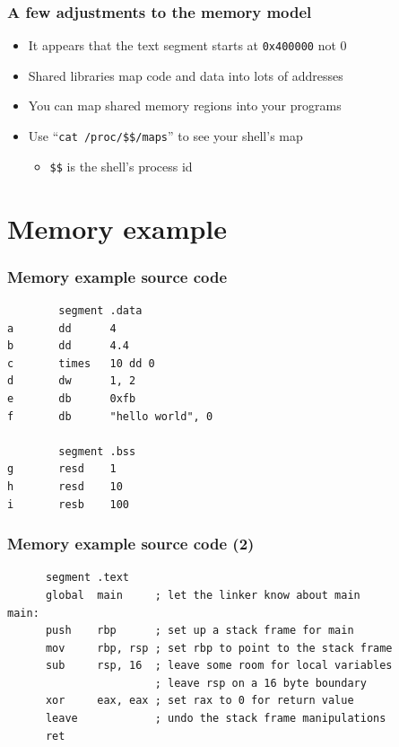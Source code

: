 \documentclass{beamer}
\begin{document}
\begin{frame}
    \frametitle{A few adjustments to the memory model}
    \begin{itemize}
        \item It appears that the text segment starts at {\tt 0x400000} not 0
        \item Shared libraries map code and data into lots of addresses
        \item You can map shared memory regions into your programs
        \item Use ``{\tt cat /proc/\$\$/maps}'' to see your shell's map
        \begin{itemize}
            \item {\tt \$\$} is the shell's process id
        \end{itemize}
    \end{itemize}
\end{frame}

\section{Memory example}

\begin{frame}[fragile]
    \frametitle{Memory example source code}
\begin{verbatim}
        segment .data
a       dd      4
b       dd      4.4
c       times   10 dd 0
d       dw      1, 2
e       db      0xfb
f       db      "hello world", 0

        segment .bss
g       resd    1
h       resd    10
i       resb    100
\end{verbatim}
\end{frame}

\begin{frame}[fragile]
    \frametitle{Memory example source code (2)}
\begin{verbatim}
      segment .text
      global  main     ; let the linker know about main
main:
      push    rbp      ; set up a stack frame for main
      mov     rbp, rsp ; set rbp to point to the stack frame
      sub     rsp, 16  ; leave some room for local variables
                       ; leave rsp on a 16 byte boundary
      xor     eax, eax ; set rax to 0 for return value
      leave            ; undo the stack frame manipulations
      ret    
\end{verbatim}
\end{frame}
\end{document}
